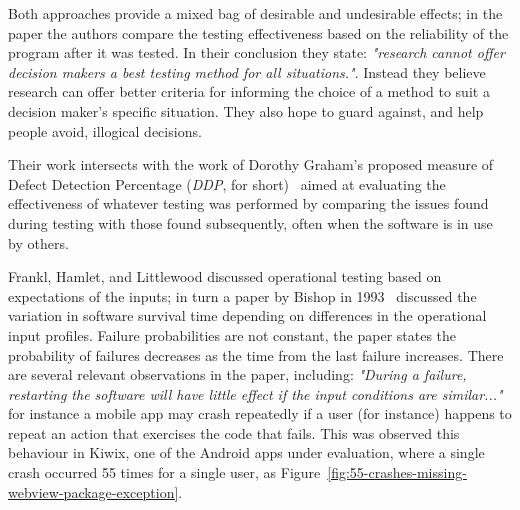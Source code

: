 Both approaches provide a mixed bag of desirable and undesirable effects; in the paper the authors compare the testing effectiveness based on the reliability of the program after it was tested. In their conclusion they state: \emph{"research cannot offer decision makers a best testing method for all situations."}. Instead they believe research can offer better criteria for informing the choice of a method to suit a decision maker's specific situation. They also hope to guard against, and help people avoid, illogical decisions.

Their work intersects with the work of Dorothy Graham's proposed measure of Defect Detection Percentage (\emph{DDP}, for short)~\cite{graham_measuring_2009} aimed at evaluating the effectiveness of whatever testing was performed by comparing the issues found during testing with those found subsequently, often when the software is in use by others.

Frankl, Hamlet, and Littlewood discussed operational testing based on expectations of the inputs; in turn a paper by Bishop in 1993~\cite{bishop1993variation} discussed the variation in software survival time depending on differences in the operational input profiles. Failure probabilities are not constant, the paper states the probability of failures decreases as the time from the last failure increases. There are several relevant observations in the paper, including: \emph{"During a failure, restarting the software will have little effect if the input conditions are similar..."} for instance a mobile app may crash repeatedly if a user (for instance) happens to repeat an action that exercises the code that fails. This was observed this behaviour in Kiwix, one of the Android apps under evaluation, where a single crash occurred 55 times for a single user, as Figure~\ref{fig:55-crashes-missing-webview-package-exception}.


